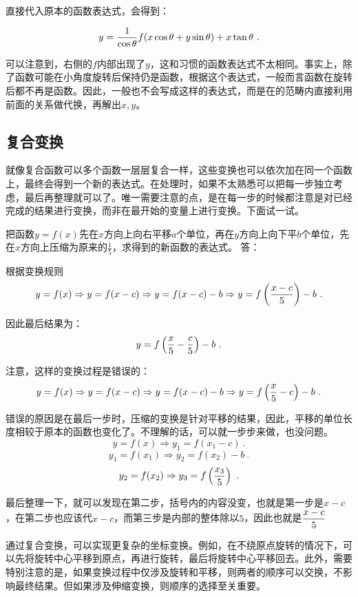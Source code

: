 直接代入原本的函数表达式，会得到：

\begin{equation}
y  ={1\over\cos \theta}f(x \cos \theta + y \sin \theta)+x \tan \theta~.
\end{equation}

可以注意到，右侧的$f$内部出现了$y$，这和习惯的函数表达式不太相同。事实上，除了函数可能在小角度旋转后保持仍是函数，根据这个表达式，一般而言函数在旋转后都不再是函数。因此，一般也不会写成这样的表达式，而是在的范畴内直接利用前面的关系做代换，再解出$x,y$。

\subsection{复合变换}

就像复合函数可以多个函数一层层复合一样，这些变换也可以依次加在同一个函数上，最终会得到一个新的表达式。在处理时，如果不太熟悉可以把每一步独立考虑，最后再整理就可以了。唯一需要注意的点，是在每一步的时候都注意是对已经完成的结果进行变换，而非在最开始的变量上进行变换。下面试一试。

\begin{exercise}{把函数$y=f(x)$先在$x$方向上向右平移$a$个单位，再在$y$方向上向下平$b$个单位，先在$x$方向上压缩为原来的$\displaystyle\frac{1}{5}$，求得到的新函数的表达式。}
答：

根据变换规则
$$\displaystyle y=f(x)\Rightarrow y=f(x-c)\Rightarrow y=f(x-c)-b\Rightarrow y=f\left({{x-c}\over 5}\right)-b~.$$

因此最后结果为：
$$y=f\left({x\over 5}-{c\over5}\right)-b~.$$

注意，这样的变换过程是错误的：
$$\displaystyle y=f(x)\Rightarrow y=f(x-c)\Rightarrow y=f(x-c)-b\Rightarrow y=f\left({x\over 5}-c\right)-b~.$$

错误的原因是在最后一步时，压缩的变换是针对平移的结果，因此，平移的单位长度相较于原本的函数也变化了。不理解的话，可以就一步步来做，也没问题。
$$\displaystyle y=f(x)\Rightarrow y_1=f(x_1-c)~.$$
$$\displaystyle y_1=f(x_1)\Rightarrow y_2=f(x_2)-b~.$$
$$\displaystyle y_2=f(x_2)\Rightarrow y_3=f\left({{x_3}\over 5}\right)~.$$

最后整理一下，就可以发现在第二步，括号内的内容没变，也就是第一步是$x-c$，在第二步也应该代$x-c$，而第三步是内部的整体除以$5$，因此也就是$\displaystyle {x-c\over5}$

\end{exercise}

通过复合变换，可以实现更复杂的坐标变换。例如，在不绕原点旋转的情况下，可以先将旋转中心平移到原点，再进行旋转，最后将旋转中心平移回去。此外，需要特别注意的是，如果变换过程中仅涉及旋转和平移，则两者的顺序可以交换，不影响最终结果。但如果涉及伸缩变换，则顺序的选择至关重要。

